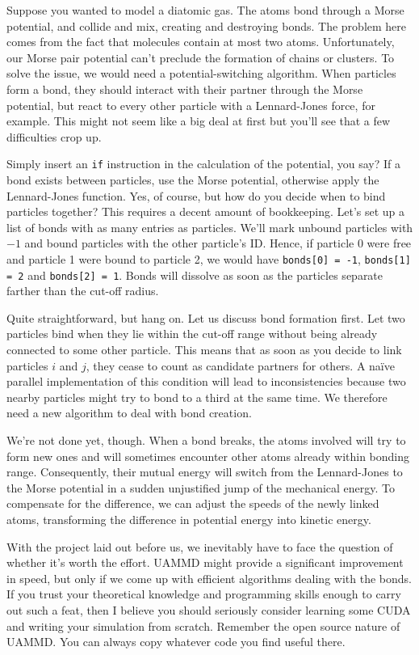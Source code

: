 Suppose you wanted to model a diatomic gas. The atoms bond through a Morse 
potential, and collide and mix, creating and destroying bonds. The problem here 
comes from the fact that molecules contain at most two atoms. Unfortunately, our 
Morse pair potential can't preclude the formation of chains or clusters. To 
solve the issue, we would need a potential-switching algorithm. When particles 
form a bond, they should interact with their partner through the Morse 
potential, but react to every other particle with a Lennard-Jones force, for 
example. This might not seem like a big deal at first but you'll see that a few 
difficulties crop up.

Simply insert an \texttt{if} instruction in the calculation of the potential,
you say? If a bond exists between particles, use the Morse potential, otherwise 
apply the Lennard-Jones function. Yes, of course, but how do you decide when to 
bind particles together? This requires a decent amount of bookkeeping. Let's set 
up a list of bonds with as many entries as particles. We'll mark unbound 
particles with $-1$ and bound particles with the other particle's ID. Hence, 
if particle 0 were free and particle 1 were bound to particle 2, we would have
\texttt{bonds[0] = -1}, \texttt{bonds[1] = 2} and \texttt{bonds[2] = 1}. Bonds 
will dissolve as soon as the particles separate farther than the cut-off radius.

Quite straightforward, but hang on. Let us discuss bond formation first. Let two 
particles bind when they lie within the cut-off range without being already 
connected to some other particle. This means that as soon as you decide to link 
particles $i$ and $j$, they cease to count as candidate partners for others. A 
na\"ive parallel implementation of this condition will lead to inconsistencies 
because two nearby particles might try to bond to a third at the same time. We 
therefore need a new algorithm to deal with bond creation.

We're not done yet, though. When a bond breaks, the atoms involved will try to 
form new ones and will sometimes encounter other atoms already within bonding 
range. Consequently, their mutual energy will switch from the Lennard-Jones to 
the Morse potential in a sudden unjustified jump of the mechanical energy. To 
compensate for the difference, we can adjust the speeds of the newly linked 
atoms, transforming the difference in potential energy into kinetic energy.

With the project laid out before us, we inevitably have to face the question of 
whether it's worth the effort. UAMMD might provide a significant improvement in 
speed, but only if we come up with efficient algorithms dealing with the bonds. 
If you trust your theoretical knowledge and programming skills enough to carry 
out such a feat, then I believe you should seriously consider learning some CUDA 
and writing your simulation from scratch. Remember the open source nature of 
UAMMD. You can always copy whatever code you find useful there.

